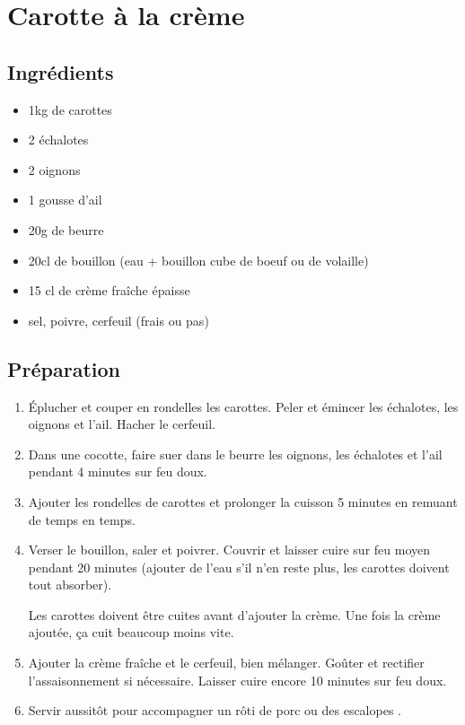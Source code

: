 \newpage
\section{Carotte à la crème}
\subsection*{Ingrédients}
\begin{itemize}
\item  1kg de carottes
\item 2 échalotes
\item 2 oignons
\item 1 gousse d'ail
\item 20g de beurre
\item 20cl de bouillon (eau + bouillon cube de boeuf ou de volaille)
\item 15 cl de crème fraîche épaisse
\item sel, poivre, cerfeuil (frais ou pas)
\end{itemize}

\subsection*{Préparation}
\begin{enumerate}
\item Éplucher et couper en rondelles les carottes. Peler et émincer les échalotes, les oignons et l’ail. Hacher le cerfeuil.

\item Dans une cocotte, faire suer dans le beurre les oignons, les échalotes et l’ail pendant 4 minutes sur feu doux.

\item Ajouter les rondelles de carottes et prolonger la cuisson 5 minutes en remuant de temps en temps.

\item Verser le bouillon, saler et poivrer. Couvrir et laisser cuire sur feu moyen pendant 20 minutes (ajouter de l'eau s'il n'en reste plus, les carottes doivent tout absorber).

\begin{remarque}
Les carottes doivent être cuites avant d'ajouter la crème. Une fois la crème ajoutée, ça cuit beaucoup moins vite.
\end{remarque}

\item Ajouter la crème fraîche et le cerfeuil, bien mélanger. Goûter et rectifier l’assaisonnement si nécessaire. Laisser cuire encore 10 minutes sur feu doux.

\item Servir aussitôt pour accompagner un rôti de porc ou des escalopes .
\end{enumerate}

